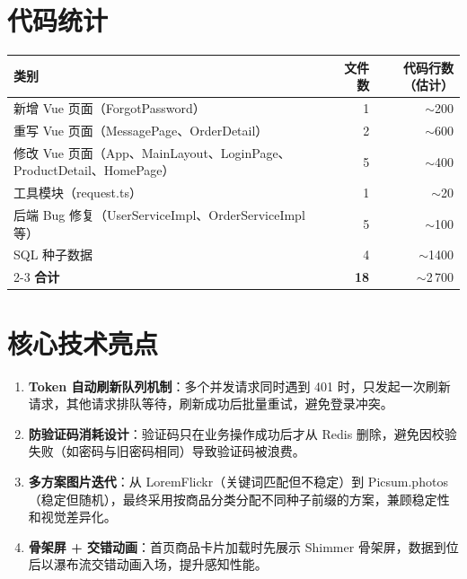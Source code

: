 \documentclass[12pt,a4paper]{ctexart}
\begin{document}
\section{代码统计}

\begin{table}[H]
\centering
\begin{tabular}{lrr}
\toprule
\textbf{类别} & \textbf{文件数} & \textbf{代码行数（估计）} \\
\midrule
新增 Vue 页面（ForgotPassword） & 1 & $\sim$200 \\
重写 Vue 页面（MessagePage、OrderDetail） & 2 & $\sim$600 \\
修改 Vue 页面（App、MainLayout、LoginPage、ProductDetail、HomePage） & 5 & $\sim$400 \\
工具模块（request.ts） & 1 & $\sim$20 \\
后端 Bug 修复（UserServiceImpl、OrderServiceImpl 等） & 5 & $\sim$100 \\
SQL 种子数据 & 4 & $\sim$1400 \\
\cmidrule{2-3}
\textbf{合计} & \textbf{18} & $\sim$2\,700 \\
\bottomrule
\end{tabular}
\end{table}

\section{核心技术亮点}

\begin{enumerate}
    \item \textbf{Token 自动刷新队列机制}：多个并发请求同时遇到 401 时，只发起一次刷新请求，其他请求排队等待，刷新成功后批量重试，避免登录冲突。
    \item \textbf{防验证码消耗设计}：验证码只在业务操作成功后才从 Redis 删除，避免因校验失败（如密码与旧密码相同）导致验证码被浪费。
    \item \textbf{多方案图片迭代}：从 LoremFlickr（关键词匹配但不稳定）到 Picsum.photos（稳定但随机），最终采用按商品分类分配不同种子前缀的方案，兼顾稳定性和视觉差异化。
    \item \textbf{骨架屏 + 交错动画}：首页商品卡片加载时先展示 Shimmer 骨架屏，数据到位后以瀑布流交错动画入场，提升感知性能。
\end{enumerate}
\end{document}
